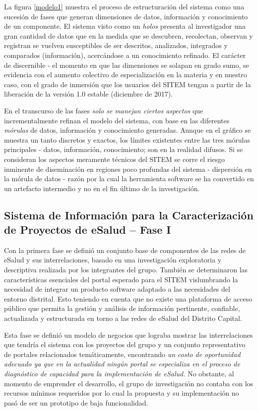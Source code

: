 La figura \ref{modelo1} muestra el proceso de estructuración del sistema como una sucesión de fases que generan dimensiones de datos, información y conocimiento de un componente. El sistema visto como un \textit{holos} presenta al investigador una gran cantidad de datos que en la medida que se descubren, recolectan, observan y registran se vuelven susceptibles de ser descritos, analizados, integrados y comparados (información), acercándose a un conocimiento refinado. El carácter de discernible - el momento en que las dimensiones se solapan en grado sumo, se evidencia con el aumento colectivo de especialización en la materia y en nuestro caso, con el grado de inmersión que los usuarios del SITEM tengan a partir de la liberación de la versión 1.0 estable (diciembre de 2017).

En el transcurso de las fases \textit{solo se manejan ciertos aspectos} que incrementalmente refinan el modelo del sistema, con base en las diferentes \textit{mórulas} de datos, información y conocimiento generadas. Aunque en el gráfico se muestra un tanto discretos y exactos, los límites existentes entre las tres mórulas principales - datos, información, conocimiento; son en la realidad difusos. Si se consideran los aspectos meramente técnicos del SITEM se corre el riesgo inminente de diseminación en regiones poco profundas del sistema - dispersión en la mórula de datos - razón por la cual la herramienta software se ha convertido en un artefacto intermedio y no en el fin último de la investigación.

\subsection{Sistema de Información para la Caracterización de Proyectos de eSalud – Fase I}
Con la primera fase  se definió un conjunto base de componentes de las redes de eSalud y sus interrelaciones, basado en una investigación exploratoria y descriptiva realizada por los integrantes del grupo. También se determinaron las características esenciales del portal esperado para el SITEM vislumbrando la necesidad de integrar un producto software adaptado a las necesidades del entorno distrital. Esto teniendo en cuenta que no existe una plataforma de acceso público que permita la gestión y análisis de información pertinente, confiable, actualizada y estructurada en torno a las redes de eSalud del Distrito Capital.

Esta fase se definió un modelo de negocios que lograba mostrar las interrelaciones que tendría el sistema con los proyectos del grupo y un conjunto representativo de portales relacionados temáticamente, encontrando \textit{un costo de oportunidad adecuado ya que en la actualidad ningún portal se especializa en el proceso de diagnóstico de capacidad para la implementación de eSalud.} No obstante, al momento de emprender el desarrollo, el grupo de investigación no contaba con los recursos mínimos requeridos por lo cual la propuesta y su implementación no pasó de ser un prototipo de baja funcionalidad. 

